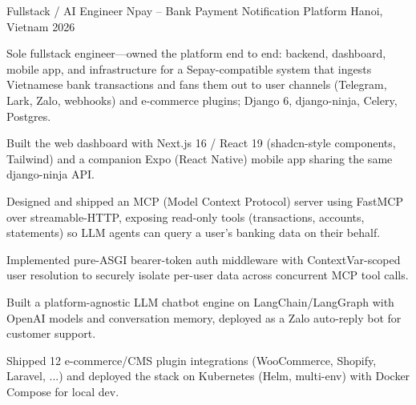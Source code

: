

\begin{cventries}


\cventry
  {Fullstack / AI Engineer} %
  {Npay -- Bank Payment Notification Platform} %
  {Hanoi, Vietnam} %
  {2026} %
  {
    \begin{cvitems}
      \item {Sole fullstack engineer—owned the platform end to end: backend, dashboard, mobile app, and infrastructure for a Sepay-compatible system that ingests Vietnamese bank transactions and fans them out to user channels (Telegram, Lark, Zalo, webhooks) and e-commerce plugins; Django 6, django-ninja, Celery, Postgres.}
      \item {Built the web dashboard with Next.js 16 / React 19 (shadcn-style components, Tailwind) and a companion Expo (React Native) mobile app sharing the same django-ninja API.}
      \item {Designed and shipped an MCP (Model Context Protocol) server using FastMCP over streamable-HTTP, exposing read-only tools (transactions, accounts, statements) so LLM agents can query a user's banking data on their behalf.}
      \item {Implemented pure-ASGI bearer-token auth middleware with ContextVar-scoped user resolution to securely isolate per-user data across concurrent MCP tool calls.}
      \item {Built a platform-agnostic LLM chatbot engine on LangChain/LangGraph with OpenAI models and conversation memory, deployed as a Zalo auto-reply bot for customer support.}
      \item {Shipped 12 e-commerce/CMS plugin integrations (WooCommerce, Shopify, Laravel, ...) and deployed the stack on Kubernetes (Helm, multi-env) with Docker Compose for local dev.}
    \end{cvitems}
  }


\end{cventries}
